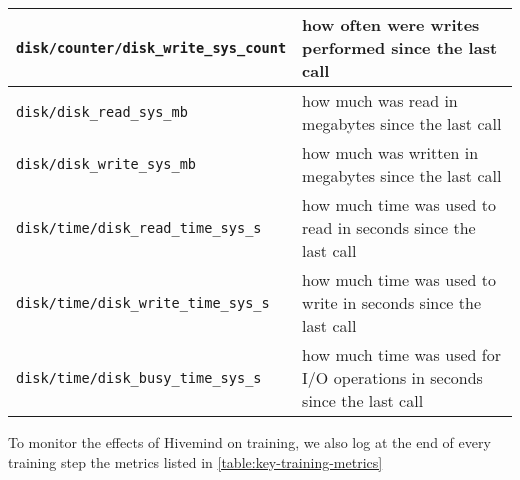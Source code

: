 \begin{tabularx}{\linewidth}{ |p{8cm}|p{6cm}| }
    \hline
    \texttt{disk/counter/disk\_write\_sys\_count}           & how often were writes performed since the last call                         \\
    \hline
    \texttt{disk/disk\_read\_sys\_mb}                       & how much was read in megabytes since the last call                          \\
    \hline
    \texttt{disk/disk\_write\_sys\_mb}                      & how much was written in megabytes since the last call                       \\
    \hline
    \texttt{disk/time/disk\_read\_time\_sys\_s}             & how much time was used to read in seconds since the last call               \\
    \hline
    \texttt{disk/time/disk\_write\_time\_sys\_s}            & how much time was used to write in seconds since the last call              \\
    \hline
    \texttt{disk/time/disk\_busy\_time\_sys\_s}             & how much time was used for I/O operations in seconds since the last call    \\
    \hline
\end{tabularx}
\normalsize

To monitor the effects of Hivemind on training, we also log at the end of every training step the metrics listed in \autoref{table:key-training-metrics}

